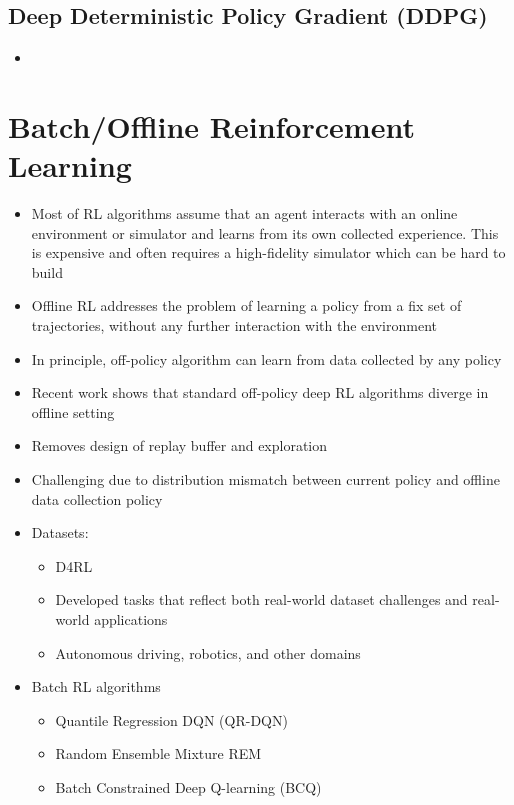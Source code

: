\documentclass[../main.tex]{subfiles}
\begin{document}
  \subsection{Deep Deterministic Policy Gradient (DDPG)}
    \begin{itemize}
      \item
    \end{itemize}


\section{Batch/Offline Reinforcement Learning}
  \begin{itemize}
    \item Most of RL algorithms assume that an agent interacts with an online environment or simulator and learns from its own collected experience. This is expensive and often requires a high-fidelity simulator which can be hard to build
    \item Offline RL addresses the problem of learning a policy from a fix set of trajectories, without any further interaction with the environment
    \item In principle, off-policy algorithm can learn from data collected by any policy
    \item Recent work shows that standard off-policy deep RL algorithms diverge in offline setting
    \item Removes design of replay buffer and exploration
    \item Challenging due to distribution mismatch between current policy and offline data collection policy
    \item Datasets:
    \begin{itemize}
      \item D4RL
      \item Developed tasks that reflect both real-world dataset challenges and real-world applications
      \item Autonomous driving, robotics, and other domains
    \end{itemize}
    \item Batch RL algorithms
    \begin{itemize}
      \item Quantile Regression DQN (QR-DQN)
      \item Random Ensemble Mixture {REM}
      \item Batch Constrained Deep Q-learning (BCQ)
    \end{itemize}


\end{itemize}
\end{document}

